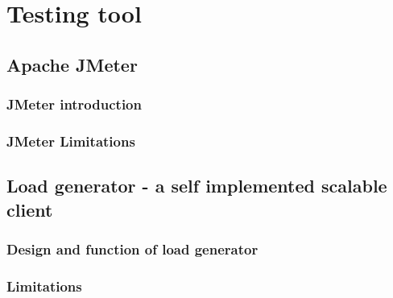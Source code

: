 \chapter{Testing tool}
\section{Apache JMeter}
\subsection{JMeter introduction}
\subsection{JMeter Limitations}
\section{Load generator - a self implemented scalable client}
\subsection{Design and function of load generator}
\subsection{Limitations}
